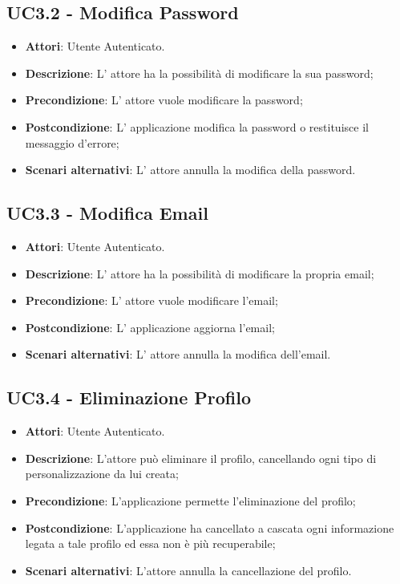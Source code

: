 \subsection{UC3.2 - Modifica Password} 
\label{ssec:UC3.2} 
\begin{itemize} 
\item \textbf{Attori}: Utente Autenticato.
\item \textbf{Descrizione}: L' attore ha la possibilità di modificare la sua password;
\item \textbf{Precondizione}: L'  attore vuole modificare la password;
\item \textbf{Postcondizione}: L' applicazione modifica la password o restituisce il messaggio d'errore;
\item \textbf{Scenari alternativi}: L' attore annulla la modifica della password.
\end{itemize} 
\subsection{UC3.3 - Modifica Email} 
\label{ssec:UC3.3} 
\begin{itemize} 
\item \textbf{Attori}: Utente Autenticato.
\item \textbf{Descrizione}: L' attore ha la possibilità di modificare la propria email;
\item \textbf{Precondizione}: L' attore vuole modificare l'email;
\item \textbf{Postcondizione}: L' applicazione aggiorna l'email;
\item \textbf{Scenari alternativi}: L' attore annulla la modifica dell'email.
\end{itemize} 
\subsection{UC3.4 - Eliminazione Profilo} 
\label{ssec:UC3.4} 
\begin{itemize} 
\item \textbf{Attori}: Utente Autenticato.
\item \textbf{Descrizione}: L'attore può eliminare il profilo, cancellando ogni tipo di personalizzazione da lui creata;
\item \textbf{Precondizione}: L'applicazione permette l'eliminazione del profilo;
\item \textbf{Postcondizione}: L'applicazione ha cancellato a cascata ogni informazione legata a tale profilo ed essa non è più recuperabile;
\item \textbf{Scenari alternativi}: L'attore annulla la cancellazione del profilo.
\end{itemize} 
